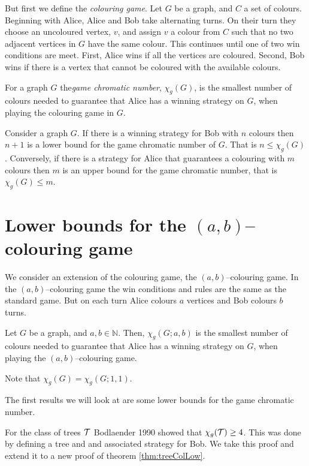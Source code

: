 But first we define the \textit{colouring game}. Let $G$ be a graph, and $C$ a set of colours. Beginning with Alice, Alice and Bob take alternating turns. On their turn they choose an uncoloured vertex, $v$, and assign $v$ a colour from $C$ such that no two adjacent vertices in $G$ have the same colour. This continues until one of two win conditions are meet. First, Alice wins if all the vertices are coloured. Second, Bob wins if there is a vertex that cannot be coloured with the available colours.


\begin{definition}
    For a graph $G$ the\textit{game chromatic number}, $\chi_g(G)$, is the smallest number of colours needed to guarantee that Alice has a winning strategy on $G$, when playing the colouring game in $G$.     
\end{definition}

Consider a graph $G$. If there is a winning strategy for Bob with $n$ colours then $n+1$ is a lower bound for the game chromatic number of $G$. That is $n\leq\chi_g(G)$. Conversely, if there is a strategy for Alice that guarantees a colouring with $m$ colours then $m$ is an upper bound for the game chromatic number, that is $\chi_g(G)\leq m$.

\section{Lower bounds for the $(a,b)$--colouring game}

We consider an extension of the colouring game, the $(a,b)$--colouring game. In the $(a,b)$--colouring game the win conditions and rules are the same as the standard game. But on each turn Alice colours $a$ vertices and Bob colours $b$ turns.
\begin{definition}
    Let $G$ be a graph, and $a,b\in\mathbb{N}$. 
    Then, $\chi_g(G;a,b)$ is the smallest number of colours needed to guarantee that Alice has a winning strategy on $G$, when playing the $(a,b)$--colouring game. 
\end{definition}
Note that $\chi_g(G) = \chi_g(G;1,1)$.

The first results we will look at are some lower bounds for the game chromatic number.


For the class of trees $\mathcal{T}$ Bodlaender 1990 \cite{bodlander1990} showed that $\chi_g(\mathcal{T}) \geq 4$. This was done by defining a tree and and associated strategy for Bob. We take this proof and extend it to a new proof of theorem \ref{thm:treeColLow}. 


